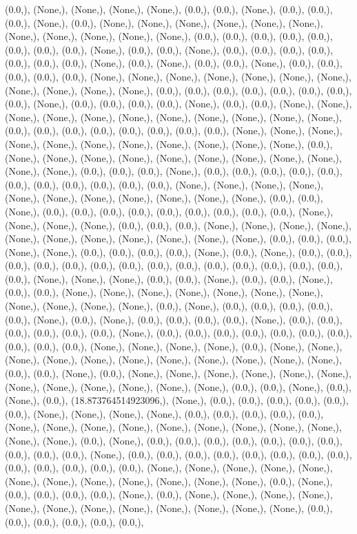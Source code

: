 \documentclass{article}
\begin{document}
(0.0,), (None,), (None,), (None,), (None,), (0.0,), (0.0,), (None,), (0.0,), (0.0,), (0.0,), (None,), (0.0,), (None,), (None,), (None,), (None,), (None,), (None,), (None,), (None,), (None,), (None,), (None,), (0.0,), (0.0,), (0.0,), (0.0,), (0.0,), (0.0,), (0.0,), (0.0,), (None,), (0.0,), (0.0,), (None,), (0.0,), (0.0,), (0.0,), (0.0,), (0.0,), (0.0,), (0.0,), (None,), (0.0,), (None,), (0.0,), (0.0,), (None,), (0.0,), (0.0,), (0.0,), (0.0,), (0.0,), (None,), (None,), (None,), (None,), (None,), (None,), (None,), (None,), (None,), (None,), (None,), (0.0,), (0.0,), (0.0,), (0.0,), (0.0,), (0.0,), (0.0,), (0.0,), (None,), (0.0,), (0.0,), (0.0,), (0.0,), (None,), (0.0,), (0.0,), (None,), (None,), (None,), (None,), (None,), (None,), (None,), (None,), (None,), (None,), (None,), (0.0,), (0.0,), (0.0,), (0.0,), (0.0,), (0.0,), (0.0,), (0.0,), (None,), (None,), (None,), (None,), (None,), (None,), (None,), (None,), (None,), (None,), (None,), (0.0,), (None,), (None,), (None,), (None,), (None,), (None,), (None,), (None,), (None,), (None,), (None,), (0.0,), (0.0,), (0.0,), (None,), (0.0,), (0.0,), (0.0,), (0.0,), (0.0,), (0.0,), (0.0,), (0.0,), (0.0,), (0.0,), (0.0,), (None,), (None,), (None,), (None,), (None,), (None,), (None,), (None,), (None,), (None,), (None,), (0.0,), (0.0,), (None,), (0.0,), (0.0,), (0.0,), (0.0,), (0.0,), (0.0,), (0.0,), (0.0,), (0.0,), (None,), (None,), (None,), (None,), (0.0,), (0.0,), (0.0,), (None,), (None,), (None,), (None,), (None,), (None,), (None,), (None,), (None,), (None,), (None,), (0.0,), (0.0,), (0.0,), (None,), (None,), (0.0,), (0.0,), (0.0,), (0.0,), (None,), (0.0,), (None,), (0.0,), (0.0,), (0.0,), (0.0,), (0.0,), (0.0,), (0.0,), (0.0,), (0.0,), (0.0,), (0.0,), (0.0,), (0.0,), (0.0,), (0.0,), (None,), (None,), (None,), (0.0,), (0.0,), (None,), (0.0,), (0.0,), (None,), (0.0,), (0.0,), (None,), (None,), (None,), (None,), (None,), (None,), (None,), (None,), (None,), (None,), (None,), (0.0,), (None,), (0.0,), (0.0,), (0.0,), (0.0,), (0.0,), (None,), (0.0,), (None,), (0.0,), (0.0,), (0.0,), (0.0,), (None,), (0.0,), (0.0,), (0.0,), (0.0,), (0.0,), (0.0,), (None,), (0.0,), (0.0,), (0.0,), (0.0,), (0.0,), (0.0,), (0.0,), (0.0,), (0.0,), (0.0,), (None,), (None,), (None,), (None,), (0.0,), (None,), (None,), (None,), (None,), (None,), (None,), (None,), (None,), (None,), (None,), (None,), (0.0,), (0.0,), (None,), (0.0,), (None,), (None,), (None,), (None,), (None,), (None,), (None,), (None,), (None,), (None,), (None,), (None,), (0.0,), (0.0,), (None,), (0.0,), (None,), (0.0,), (18.873764514923096,), (None,), (0.0,), (0.0,), (0.0,), (0.0,), (0.0,), (0.0,), (None,), (None,), (None,), (None,), (0.0,), (0.0,), (0.0,), (0.0,), (0.0,), (None,), (None,), (None,), (None,), (None,), (None,), (None,), (None,), (None,), (None,), (None,), (0.0,), (None,), (0.0,), (0.0,), (0.0,), (0.0,), (0.0,), (0.0,), (0.0,), (0.0,), (0.0,), (0.0,), (None,), (0.0,), (0.0,), (0.0,), (0.0,), (0.0,), (0.0,), (0.0,), (0.0,), (0.0,), (0.0,), (0.0,), (0.0,), (0.0,), (None,), (None,), (None,), (None,), (None,), (None,), (None,), (None,), (None,), (None,), (None,), (None,), (0.0,), (None,), (0.0,), (0.0,), (0.0,), (0.0,), (None,), (0.0,), (None,), (None,), (None,), (None,), (None,), (None,), (None,), (None,), (None,), (None,), (None,), (None,), (0.0,), (0.0,), (0.0,), (0.0,), (0.0,), (0.0,), 
\end{document}
